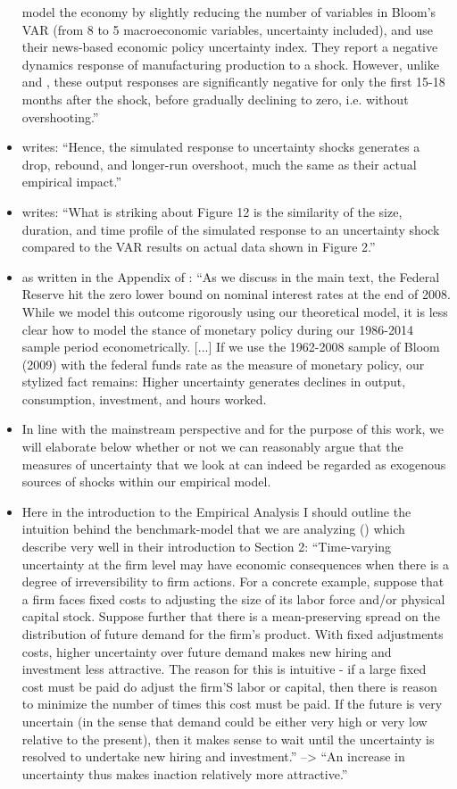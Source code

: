 \documentclass[a4paper,11pt,listof=nochaptergap,oneside,pointednumbers,bibtotoc,bigheadings,liststotoc]{scrbook}
\theoremstyle{mysatz}
\theoremstyle{mydefinition}
\theoremstyle{mybemerkung}
\begin{document}
\begin{itemize}
	\citet{bakeretal:15} model the economy by slightly reducing the number of variables in Bloom's VAR (from 8 to 5 macroeconomic variables, uncertainty included), and use their news-based economic policy uncertainty index. They report a negative dynamics response of manufacturing production to a shock. However, unlike \citet{juradoetal:15} and \citet{bachmannetal:13}, these output responses are significantly negative for only the first 15-18 months after the shock, before gradually declining to zero, i.e. without overshooting.''
	\item \citet[p. 674]{bloom:09} writes: ``Hence, the simulated response to uncertainty shocks generates a drop, rebound, and longer-run overshoot, much the same as their actual empirical impact.''
	\item \citet[p. 651]{bloom:09} writes: ``What is striking about Figure 12 is the similarity of the size, duration, and time profile of the simulated response to an uncertainty shock compared to the VAR results on actual data shown in Figure 2.''
 	\item as written in the Appendix of \citet[p. 5]{basuandbundick:17}: ``As we discuss in the main text, the Federal Reserve hit the zero lower bound on nominal interest rates at the end of 2008. While we model this outcome rigorously using our theoretical model, it is less clear how to model the stance of monetary policy during our 1986-2014 sample period econometrically. [...] If we use the 1962-2008 sample of Bloom (2009) with the federal funds rate as the measure of monetary policy, our stylized fact remains: Higher uncertainty generates declines in output, consumption, investment, and hours worked.
	\item  In line with the mainstream perspective and for the purpose of this work, we will elaborate below whether or not we can reasonably argue that the measures of uncertainty that we look at can indeed be regarded as exogenous sources of shocks within our empirical model. 
	\item Here in the introduction to the Empirical Analysis I should outline the intuition behind the benchmark-model that we are analyzing (\citet{bloom:09}) which \citet{bachmannetal:13} describe very well in their introduction to Section 2: ``Time-varying uncertainty at the firm level may have economic consequences when there is a degree of irreversibility to firm actions. For a concrete example, suppose that a firm faces fixed costs to adjusting the size of its labor force and/or physical capital stock. Suppose further that there is a mean-preserving spread on the distribution of future demand for the firm's product. With fixed adjustments costs, higher uncertainty over future demand makes new hiring and investment less attractive. The reason for this is intuitive - if a large fixed cost must be paid do adjust the firm'S labor or capital, then there is reason to minimize the number of times this cost must be paid. If the future is very uncertain (in the sense that demand could be either very high or very low relative to the present), then it makes sense to wait until the uncertainty is resolved to undertake new hiring and investment.'' --> ``An increase in uncertainty thus makes inaction relatively more attractive.'' 
\end{itemize}
\end{document}
